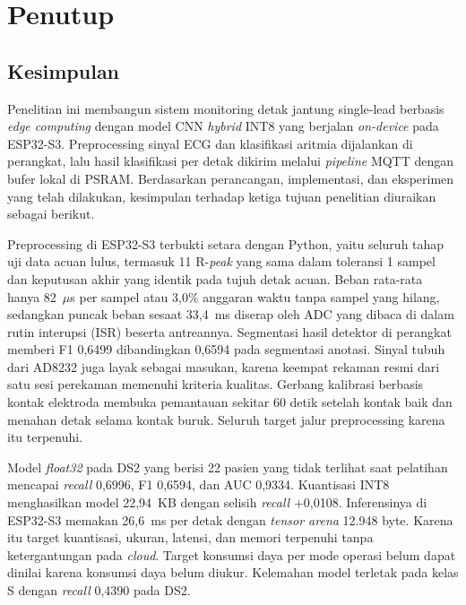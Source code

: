 \chapter{Penutup}

\section{Kesimpulan}

Penelitian ini membangun sistem monitoring detak jantung single-lead berbasis \textit{edge computing} dengan model CNN \textit{hybrid} INT8 yang berjalan \textit{on-device} pada ESP32-S3. Preprocessing sinyal ECG dan klasifikasi aritmia dijalankan di perangkat, lalu hasil klasifikasi per detak dikirim melalui \textit{pipeline} MQTT dengan bufer lokal di PSRAM. Berdasarkan perancangan, implementasi, dan eksperimen yang telah dilakukan, kesimpulan terhadap ketiga tujuan penelitian diuraikan sebagai berikut.

Preprocessing di ESP32-S3 terbukti setara dengan Python, yaitu seluruh tahap uji data acuan lulus, termasuk 11 R-\textit{peak} yang sama dalam toleransi 1 sampel dan keputusan akhir yang identik pada tujuh detak acuan. Beban rata-rata hanya 82~$\mu$s per sampel atau 3,0\% anggaran waktu tanpa sampel yang hilang, sedangkan puncak beban sesaat 33,4~ms diserap oleh ADC yang dibaca di dalam rutin interupsi (ISR) beserta antreannya. Segmentasi hasil detektor di perangkat memberi F1 0,6499 dibandingkan 0,6594 pada segmentasi anotasi. Sinyal tubuh dari AD8232 juga layak sebagai masukan, karena keempat rekaman resmi dari satu sesi perekaman memenuhi kriteria kualitas. Gerbang kalibrasi berbasis kontak elektroda membuka pemantauan sekitar 60 detik setelah kontak baik dan menahan detak selama kontak buruk. Seluruh target jalur preprocessing karena itu terpenuhi.

Model \textit{float32} pada DS2 yang berisi 22 pasien yang tidak terlihat saat pelatihan mencapai \textit{recall} 0,6996, F1 0,6594, dan AUC 0,9334. Kuantisasi INT8 menghasilkan model 22,94~KB dengan selisih \textit{recall} $+$0,0108. Inferensinya di ESP32-S3 memakan 26,6~ms per detak dengan \textit{tensor arena} 12.948 byte. Karena itu target kuantisasi, ukuran, latensi, dan memori terpenuhi tanpa ketergantungan pada \textit{cloud}. Target konsumsi daya per mode operasi belum dapat dinilai karena konsumsi daya belum diukur. Kelemahan model terletak pada kelas S dengan \textit{recall} 0,4390 pada DS2.

